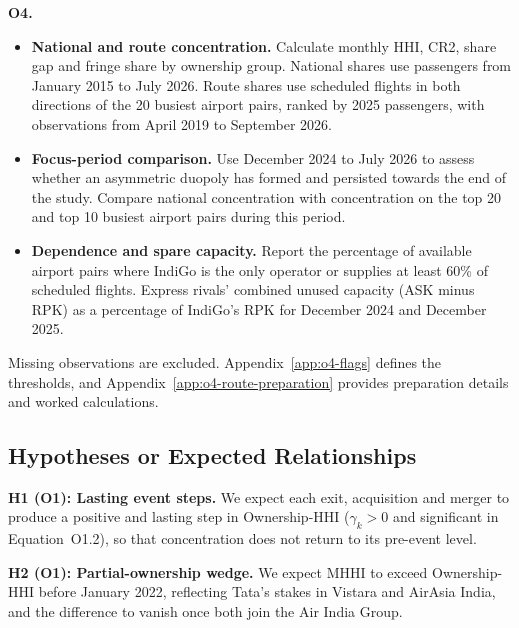 \documentclass[12pt,a4paper]{article}
\newenvironment{authorcontribution}[1]{\par\begingroup\color{#1}}{\par\endgroup}
\newcommand{\HHI}{\textsc{hhi}}
\begin{document}


\begin{authorcontribution}{authorGoutham}
\pagebreak[4]
\label{sec:method-o4}
\textbf{O4.}
\begin{itemize}[leftmargin=2em]
    \item \textbf{National and route concentration.} Calculate monthly HHI, CR2, share gap and fringe share by ownership group. National shares use passengers from January 2015 to July 2026. Route shares use scheduled flights in both directions of the 20 busiest airport pairs, ranked by 2025 passengers, with observations from April 2019 to September 2026.
    \item \textbf{Focus-period comparison.} Use December 2024 to July 2026 to assess whether an asymmetric duopoly has formed and persisted towards the end of the study. Compare national concentration with concentration on the top 20 and top 10 busiest airport pairs during this period.
    \item \textbf{Dependence and spare capacity.} Report the percentage of available airport pairs where IndiGo is the only operator or supplies at least 60\% of scheduled flights. Express rivals' combined unused capacity (ASK minus RPK) as a percentage of IndiGo's RPK for December 2024 and December 2025.
\end{itemize}
Missing observations are excluded. Appendix~\ref{app:o4-flags} defines the thresholds, and Appendix~\ref{app:o4-route-preparation} provides preparation details and worked calculations.
\end{authorcontribution}

\subsection{Hypotheses or Expected Relationships}
\label{sec:hypotheses}
\begingroup
\normalfont\normalsize\rmfamily\upshape\mdseries\onehalfspacing
{}
\renewcommand{\HHI}{HHI}
\begin{authorcontribution}{authorSowmya}
\textbf{H1 (O1): Lasting event steps.} We expect each exit, acquisition and merger to produce a positive and lasting step in Ownership-HHI ($\gamma_k>0$ and significant in Equation~O1.2), so that concentration does not return to its pre-event level.

\textbf{H2 (O1): Partial-ownership wedge.} We expect MHHI to exceed Ownership-HHI before January 2022, reflecting Tata's stakes in Vistara and AirAsia India, and the difference to vanish once both join the Air India Group.
\end{authorcontribution}
\end{document}
